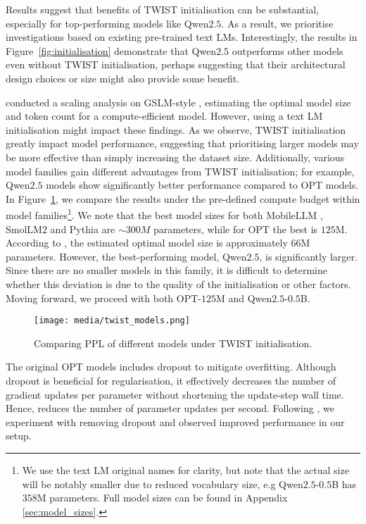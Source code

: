 Results suggest that benefits of TWIST initialisation can be substantial, especially for top-performing models like Qwen$2.5$. As a result, we prioritise investigations based on existing pre-trained text \ac{LM}s. Interestingly, the results in Figure~\ref{fig:initialisation} demonstrate that Qwen$2.5$ outperforms other models even without TWIST initialisation, perhaps suggesting that their architectural design choices or size might also provide some benefit.

 \citet{cuervo2024scaling} conducted a scaling analysis on GSLM-style \slms, estimating the optimal model size and token count for a compute-efficient model. However, using a text LM initialisation might impact these findings. As we observe, TWIST initialisation greatly impact model performance, suggesting that prioritising larger models may be more effective than simply increasing the dataset size. Additionally, various model families gain different advantages from TWIST initialisation; for example, Qwen$2.5$ models show significantly better performance compared to OPT models. In Figure~\ref{fig:model_choice}, we compare the results under the pre-defined compute budget within model families\footnote{We use the text LM original names for clarity, but note that the actual size will be notably smaller due to reduced vocabulary size, e.g Qwen$2.5$-$0.5$B has $358$M parameters. Full model sizes can be found in Appendix \ref{sec:model_sizes}.}. We note that the best model sizes for both MobileLLM \cite{mobilellm}, SmolLM$2$ \cite{smollm2} and Pythia \cite{pythia} are $\sim300M$ parameters, while for OPT the best is $125$M. According to \citet{cuervo2024scaling}, the estimated optimal model size is approximately $66$M parameters. However, the best-performing model, Qwen$2.5$, is significantly larger. Since there are no smaller models in this family, it is difficult to determine whether this deviation is due to the quality of the initialisation or other factors. Moving forward, we proceed with both OPT-$125$M and Qwen$2.5$-$0.5$B.

\begin{figure}[t!]
  \texttt{[image: media/twist\_models.png]}
  \caption{Comparing PPL of different models under TWIST initialisation.}
  \label{fig:model_choice}
\end{figure}

 The original OPT models includes dropout to mitigate overfitting. Although dropout is beneficial for regularisation, it effectively decreases the number of gradient updates per parameter without shortening the update-step wall time. Hence, reduces the number of parameter updates per second. Following \citet{geiping2023cramming}, we experiment with removing dropout and observed improved performance in our setup.

